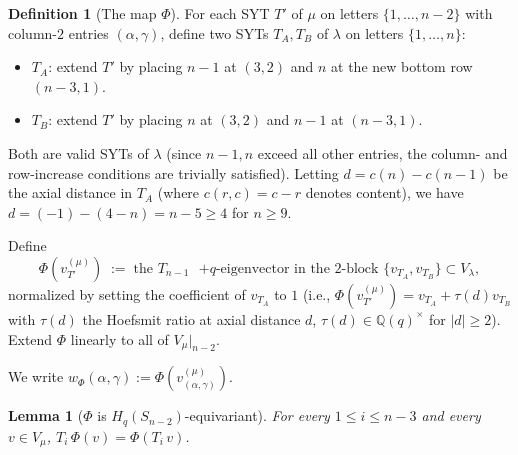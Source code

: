 \documentclass[11pt]{article}
\newtheorem{lemma}[theorem]{Lemma}
\theoremstyle{definition}
\newtheorem{definition}[theorem]{Definition}
\begin{document}
\begin{definition}[The map $\Phi$]\label{def:Phi}
For each SYT $T'$ of $\mu$ on letters $\{1,\ldots,n-2\}$ with
column-$2$ entries $(\alpha,\gamma)$, define two SYTs $T_A, T_B$
of $\lambda$ on letters $\{1,\ldots,n\}$:
\begin{itemize}[leftmargin=2em,topsep=0.3em,itemsep=0.2em]
\item $T_A$: extend $T'$ by placing $n-1$ at $(3,2)$ and $n$ at the
new bottom row $(n-3,1)$.
\item $T_B$: extend $T'$ by placing $n$ at $(3,2)$ and $n-1$ at
$(n-3,1)$.
\end{itemize}
Both are valid SYTs of $\lambda$ (since $n-1,n$ exceed all other
entries, the column- and row-increase conditions are trivially
satisfied).  Letting $d=c(n)-c(n-1)$ be the axial distance in $T_A$
(where $c(r,c)=c-r$ denotes content), we have
$d=(-1)-(4-n)=n-5\ge 4$ for $n\ge 9$.

Define
\[
   \Phi(v_{T'}^{(\mu)})\;:=\;
   \text{the $T_{n-1}$ $+q$-eigenvector in the $2$-block }
   \{v_{T_A},v_{T_B}\}\subset V_\lambda,
\]
normalized by setting the coefficient of $v_{T_A}$ to $1$ (i.e.,
$\Phi(v_{T'}^{(\mu)})=v_{T_A}+\tau(d)v_{T_B}$ with $\tau(d)$ the
Hoefsmit ratio at axial distance $d$, $\tau(d)\in\mathbb{Q}(q)^\times$
for $|d|\ge 2$).  Extend $\Phi$ linearly to all of $V_\mu|_{n-2}$.

We write $w_\Phi(\alpha,\gamma):=\Phi(v_{(\alpha,\gamma)}^{(\mu)})$.
\end{definition}

\begin{lemma}[$\Phi$ is $H_q(S_{n-2})$-equivariant]\label{lem:Phi-equiv}
For every $1\le i\le n-3$ and every $v\in V_\mu$,
$T_i\,\Phi(v)=\Phi(T_i\,v)$.
\end{lemma}
\end{document}
